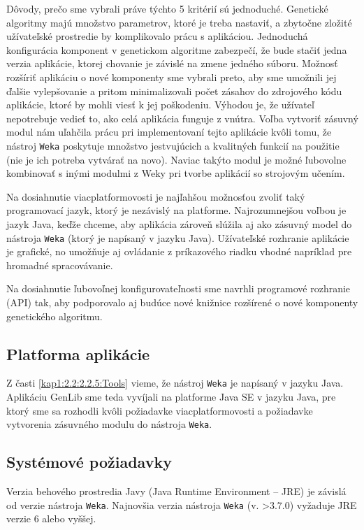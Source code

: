 Dôvody, prečo sme vybrali práve týchto 5 kritérií sú jednoduché.
Genetické algoritmy majú množstvo parametrov, ktoré je treba nastaviť, a zbytočne zložité užívateľské prostredie by komplikovalo prácu s aplikáciou. Jednoduchá konfigurácia komponent v genetickom algoritme zabezpečí, že bude stačiť jedna verzia aplikácie, ktorej chovanie je závislé na zmene jedného súboru. Možnosť rozšíriť aplikáciu o nové komponenty sme vybrali preto, aby sme umožnili jej ďalšie vylepšovanie a pritom minimalizovali počet zásahov do zdrojového kódu aplikácie, ktoré by mohli viesť k jej poškodeniu. Výhodou je, že užívateľ nepotrebuje vedieť to, ako celá aplikácia funguje z vnútra. Voľba vytvoriť zásuvný modul nám uľahčila prácu pri implementovaní tejto aplikácie kvôli tomu, že nástroj \verb|Weka| poskytuje množstvo jestvujúcich a kvalitných funkcií na použitie (nie je ich potreba vytvárať na novo). Naviac takýto modul je možné ľubovolne kombinovať s inými modulmi z Weky pri tvorbe aplikácií so strojovým učením.

Na dosiahnutie viacplatformovosti je najľahšou možnosťou zvoliť taký programovací jazyk, ktorý je nezávislý na platforme.  Najrozumnejšou voľbou je jazyk Java, keďže chceme, aby aplikácia zároveň slúžila aj ako zásuvný model do nástroja \verb|Weka| (ktorý je napísaný v jazyku Java). Užívateľské rozhranie aplikácie je grafické, no umožňuje aj ovládanie z príkazového riadku vhodné napríklad pre hromadné spracovávanie.

Na dosiahnutie ľubovoľnej konfigurovateľnosti sme navrhli programové rozhranie (API) tak, aby podporovalo aj budúce nové knižnice rozšírené o nové komponenty genetického algoritmu.

\subsection{Platforma aplikácie}\label{kap4:4.1:4.1.2:Environment}
Z časti \ref{kap1:2.2:2.2.5:Tools} vieme, že nástroj \verb|Weka| je napísaný v jazyku Java.
Aplikáciu GenLib sme teda vyvíjali na platforme Java SE v jazyku Java, pre ktorý sme sa rozhodli kvôli požiadavke viacplatformovosti a požiadavke vytvorenia zásuvného modulu do nástroja \verb|Weka|.
\subsection{Systémové požiadavky}\label{kap4:4.1:4.1.3:SystemRequirements}
Verzia behového prostredia Javy (Java Runtime Environment -- JRE) je závislá od verzie nástroja \verb|Weka|. Najnovšia verzia nástroja \verb|Weka| (v. >3.7.0) vyžaduje JRE verzie 6 alebo vyššej.


